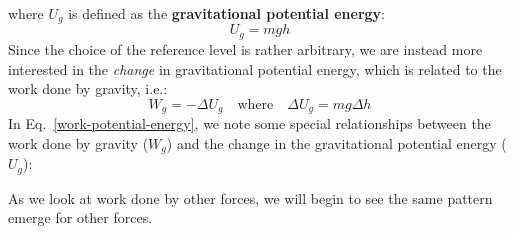\documentclass[11pt]{article}
\begin{document}
where $U_g$ is defined as the \textbf{gravitational potential energy}:
\begin{equation}
  \boxed{U_g=mgh}
\end{equation}
Since the choice of the reference level is rather arbitrary, we are instead
more interested in the \emph{change} in gravitational potential energy, which
is related to the work done by gravity, i.e.:
\begin{equation}
  \boxed{
    W_g=-\Delta U_g
  }\quad\text{where}\quad
  \boxed{
    \Delta U_g=mg\Delta h
  }
  \label{work-potential-energy}
\end{equation}
In Eq.~\ref{work-potential-energy}, we note some special relationships between
the work done by gravity ($W_g$) and the change in the gravitational potential
energy ($U_g$):


As we look at work done by other forces, we will begin to see the same pattern
emerge for other forces.
\end{document}
